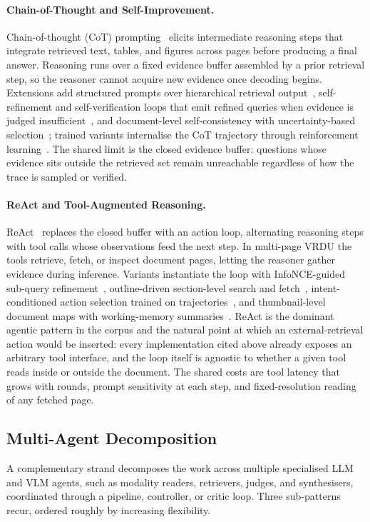 \documentclass[11pt]{article}
\begin{document}
\paragraph{Chain-of-Thought and Self-Improvement.}
Chain-of-thought (CoT) prompting~\cite{wei2022chain} elicits intermediate reasoning steps that integrate retrieved text, tables, and figures across pages before producing a final answer. Reasoning runs over a fixed evidence buffer assembled by a prior retrieval step, so the reasoner cannot acquire new evidence once decoding begins. Extensions add structured prompts over hierarchical retrieval output~\cite{gong2025mhier}, self-refinement and self-verification loops that emit refined queries when evidence is judged insufficient~\cite{jain2025simpledoc}, and document-level self-consistency with uncertainty-based selection~\cite{hannan2025docslm}; trained variants internalise the CoT trajectory through reinforcement learning~\cite{xiong2026docr1}. The shared limit is the closed evidence buffer: questions whose evidence sits outside the retrieved set remain unreachable regardless of how the trace is sampled or verified.

\paragraph{ReAct and Tool-Augmented Reasoning.}
ReAct~\cite{yao2022react} replaces the closed buffer with an action loop, alternating reasoning steps with tool calls whose observations feed the next step. In multi-page VRDU the tools retrieve, fetch, or inspect document pages, letting the reasoner gather evidence during inference. Variants instantiate the loop with InfoNCE-guided sub-query refinement~\cite{wu2025docreact}, outline-driven section-level search and fetch~\cite{sun2025docagent}, intent-conditioned action selection trained on trajectories~\cite{zhang2026docdancer}, and thumbnail-level document maps with working-memory summaries~\cite{zheng2026docvstar}. ReAct is the dominant agentic pattern in the corpus and the natural point at which an external-retrieval action would be inserted: every implementation cited above already exposes an arbitrary tool interface, and the loop itself is agnostic to whether a given tool reads inside or outside the document. The shared costs are tool latency that grows with rounds, prompt sensitivity at each step, and fixed-resolution reading of any fetched page.

\subsection{Multi-Agent Decomposition}
A complementary strand decomposes the work across multiple specialised LLM and VLM agents, such as modality readers, retrievers, judges, and synthesisers, coordinated through a pipeline, controller, or critic loop. Three sub-patterns recur, ordered roughly by increasing flexibility.
\end{document}

